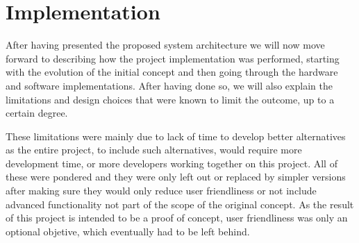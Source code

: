 \chapter{Implementation} \label{chap:impl}

After having presented the proposed system architecture we will now move forward to describing how the project implementation was performed, starting with the evolution of the initial concept and then going through the hardware and software implementations.
After having done so, we will also explain the limitations and design choices that were known to limit the outcome, up to a certain degree.

These limitations were mainly due to lack of time to develop better alternatives as the entire project, to include such alternatives, would require more development time, or more developers working together on this project.
All of these were pondered and they were only left out or replaced by simpler versions after making sure they would only reduce user friendliness or not include advanced functionality not part of the scope of the original concept.
As the result of this project is intended to be a proof of concept, user friendliness was only an optional objetive, which eventually had to be left behind.










